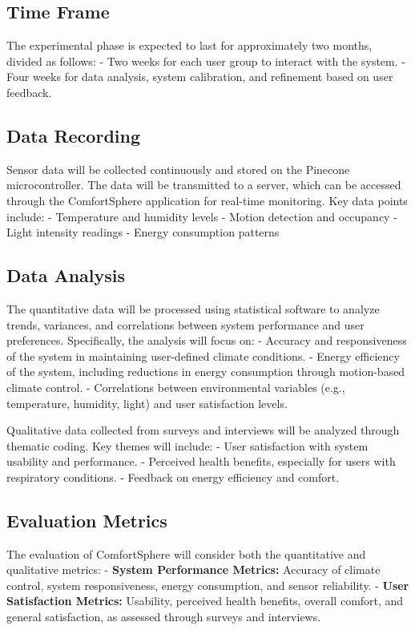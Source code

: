 \documentclass[a4paper]{scrartcl}
\begin{document}
	\subsection{Time Frame}
	The experimental phase is expected to last for approximately two months, divided as follows:
	- Two weeks for each user group to interact with the system.
	- Four weeks for data analysis, system calibration, and refinement based on user feedback.

	\subsection{Data Recording}
	Sensor data will be collected continuously and stored on the Pinecone microcontroller. The data will be transmitted to a server, which can be accessed through the ComfortSphere application for real-time monitoring. Key data points include:
	- Temperature and humidity levels
	- Motion detection and occupancy
	- Light intensity readings
	- Energy consumption patterns

	\subsection{Data Analysis}
	The quantitative data will be processed using statistical software to analyze trends, variances, and correlations between system performance and user preferences. Specifically, the analysis will focus on:
	- Accuracy and responsiveness of the system in maintaining user-defined climate conditions.
	- Energy efficiency of the system, including reductions in energy consumption through motion-based climate control.
	- Correlations between environmental variables (e.g., temperature, humidity, light) and user satisfaction levels.

	Qualitative data collected from surveys and interviews will be analyzed through thematic coding. Key themes will include:
	- User satisfaction with system usability and performance.
	- Perceived health benefits, especially for users with respiratory conditions.
	- Feedback on energy efficiency and comfort.

	\subsection{Evaluation Metrics}
	The evaluation of ComfortSphere will consider both the quantitative and qualitative metrics:
	- \textbf{System Performance Metrics:} Accuracy of climate control, system responsiveness, energy consumption, and sensor reliability.
	- \textbf{User Satisfaction Metrics:} Usability, perceived health benefits, overall comfort, and general satisfaction, as assessed through surveys and interviews.
\end{document}
